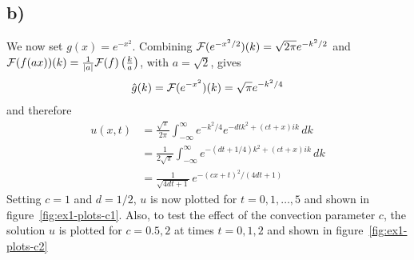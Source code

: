    \subsection*{b)}
    We now set $g(x)=e^{-x^2}$. Combining $\mathcal{F}(e^{-x^2/2})(k)=\sqrt{2\pi}e^{-k^2/2}$ and $\mathcal{F}(f(ax))(k)=\frac{1}{|a|}\mathcal{F}(f)\left(\frac{k}{a}\right)$, with $a=\sqrt{2}$, gives
    \begin{equation*}
        \hat{g}(k) = \mathcal{F}(e^{-x^2})(k) = \sqrt{\pi}e^{-k^2/4}
    \end{equation*}
    and therefore
    \begin{align*}
        u(x, t) &= \frac{\sqrt{\pi}}{2\pi}\int_{-\infty}^\infty e^{-k^2/4}e^{-dtk^2+(ct+x)ik}\,dk \\
                &= \frac{1}{2\sqrt{\pi}}\int_{-\infty}^\infty e^{-(dt+1/4)k^2+(ct+x)ik}\,dk \\
                &= \frac{1}{\sqrt{4dt+1}}\,e^{-(cx+t)^2/(4dt+1)}
    \end{align*}
    Setting $c=1$ and $d=1/2$, $u$ is now plotted for $t=0,1,\dots,5$ and shown in figure~\ref{fig:ex1-plots-c1}. Also, to test the effect of the convection parameter $c$, the solution $u$ is plotted for $c=0.5,2$ at times $t=0,1,2$ and shown in figure~\ref{fig:ex1-plots-c2}
